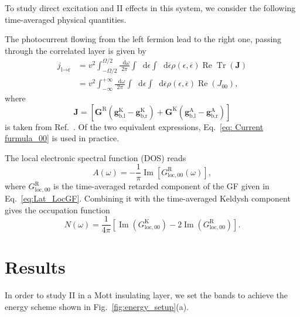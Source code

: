 \documentclass[aps,prb,groupedaddress,showpacs,twocolumn,superscriptaddress,10pt]{revtex4-2}
\newcommand*\dd{\mathop{}\!\mathrm{d}}
\DeclareMathOperator*{\rre}{Re}
\DeclareMathOperator*{\iim}{Im}
\DeclareMathOperator*{\Tr}{Tr}
\begin{document}
To study direct excitation and II effects in this system,
we consider the following time-averaged physical quantities.

The photocurrent flowing from the left fermion lead to the right one, passing through the correlated layer is given by 
% 
\begin{align}
j_{\text{l}\rightarrow\text{r}}&=v^2\int_{-\Omega/2}^{\Omega/2}\frac{\dd\omega}{2\pi} \int \dd\epsilon \int \dd\overline{\epsilon} \rho(\epsilon,\overline{\epsilon}) \rre\Tr(\boldsymbol{J})\label{eq: Current furmula_Omega}\\
&= v^2\int_{-\infty}^{+\infty}\frac{\dd\omega}{2\pi} \int \dd\epsilon \int \dd\overline{\epsilon} \rho(\epsilon,\overline{\epsilon}) \rre(J_{00}),\label{eq: Current furmula_00}
\end{align}
% 
where
% 
\begin{equation}
  \boldsymbol{J}=\left[\boldsymbol{G}^{\text{R}}(\boldsymbol{g}_{\text{b},\text{l}}^{\text{K}}-\boldsymbol{g}_{\text{b},\text{r}}^{\text{K}})+\boldsymbol{G}^{\text{K}}(\boldsymbol{g}_{\text{b},\text{l}}^{\text{A}}-\boldsymbol{g}_{\text{b},\text{r}}^{\text{A}})\right]
\end{equation}
% 
is taken from Ref.~\cite{so.do.18}. Of the two equivalent expressions, Eq.~\eqref{eq: Current furmula_00} is used in practice.

The local electronic spectral function (DOS) reads
%  
\begin{equation}
\label{eq:el_spectral_function}
 A(\omega)=-\frac{1}{\pi}\iim[G_{\text{loc},00}^{\text{R}}(\omega)],
\end{equation}
% 
where $G^{\text{R}}_{\text{loc},00}$ is the time-averaged retarded component of the GF given in Eq.~\eqref{eq:Lat_LocGF}.
Combining it with the time-averaged Keldysh component gives the occupation function
\begin{equation}
N(\omega) = \frac{1}{4\pi} [\iim(G^{\text{K}}_{\text{loc},00})-2\iim(G^{\text{R}}_{\text{loc},00})].
\end{equation}

\section{Results}
\label{sec:results}       
 
In order to study II in a Mott insulating layer, we set the bands to achieve the energy scheme shown in Fig.~\ref{fig:energy_setup}(a).
\end{document}
